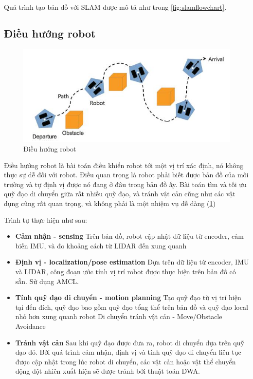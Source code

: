Quá trình tạo bản đồ với SLAM được mô tả như trong \figurename{\ref{fig:slamflowchart}}.

\subsection{Điều hướng robot}
\begin{figure}[tph]
	\centering
	\includegraphics[width=0.7\linewidth]{chapter2/figs/navigation}
	\caption{Điều hướng robot}
	\label{fig:navigation}
\end{figure}
Điều hướng robot là bài toán điều khiển robot tới một vị trí xác định, nó không thực sự dễ đối với robot. Điều quan trọng là robot phải biết được bản đồ của môi trường và tự định vị được nó đang ở đâu trong bản đồ ấy. Bài toán tìm và tối ưu quỹ đạo di chuyển giữa rất nhiều quỹ đạo, và tránh vật cản cũng như các vật dụng cũng rất quan trọng, và không phải là một nhiệm vụ dễ dàng (\figurename{\ref{fig:navigation}})

Trình tự thực hiện như sau:
\begin{itemize}
	\item \textbf{Cảm nhận - sensing}
	Trên bản đồ, robot cập nhật dữ liệu từ encoder, cảm biến IMU, và đo khoảng cách từ LIDAR đến xung quanh
	\item \textbf{Định vị - localization/pose estimation}
	Dựa trên dữ liệu từ encoder, IMU và LIDAR, công đoạn ước tính vị trí robot được thực hiện trên bản đồ có sẵn. Sử dụng AMCL.
	\item \textbf{Tính quỹ đạo di chuyển - motion planning}
	Tạo quỹ đạo từ vị trí hiện tại đến đích, quỹ đạo bao gồm quỹ đạo tổng thể trên bản đồ và quỹ đạo local nhỏ hơn xung quanh robot
	Di chuyển tránh vật cản - Move/Obstacle Avoidance
	\item \textbf{Tránh vật cản}
	Sau khi quỹ đạo được đưa ra, robot di chuyển dựa trên quỹ đạo đó. Bởi quá trình cảm nhận, định vị và tính quỹ đạo di chuyển liên tục được cập nhật trong lúc robot di chuyển, các vật cản hoặc vật thể chuyển động đột nhiên xuất hiện sẽ được tránh bởi thuật toán DWA.
		
\end{itemize}

